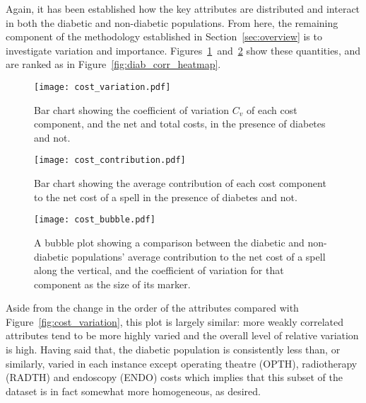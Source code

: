 Again, it has been established how the key attributes are distributed and
interact in both the diabetic and non-diabetic populations. From here, the 
remaining component of the methodology established in Section~\ref{sec:overview}
is to investigate variation and importance.
Figures~\ref{fig:diab_variation}~and~\ref{fig:diab_contribution} show these
quantities, and are ranked as in Figure~\ref{fig:diab_corr_heatmap}.

\begin{figure}[h]
    \centering
    \texttt{[image: cost\_variation.pdf]}
    \caption{Bar chart showing the coefficient of variation \(C_{v}\) of each
        cost component, and the net and total costs, in the presence of diabetes
        and not.}%
    \label{fig:diab_variation}
\end{figure}

\begin{figure}[h]
    \centering
    \texttt{[image: cost\_contribution.pdf]}
    \caption{Bar chart showing the average contribution of each cost component
        to the net cost of a spell in the presence of diabetes and not.}%
    \label{fig:diab_contribution}
\end{figure}

\begin{figure}[h]
    \centering
    \texttt{[image: cost\_bubble.pdf]}
    \caption{A bubble plot showing a comparison between the diabetic and
        non-diabetic populations' average contribution to the net cost of a
        spell along the vertical, and the coefficient of variation for that
        component as the size of its marker.}%
    \label{fig:diab_bubble}
\end{figure}

Aside from the change in the order of the attributes compared with
Figure~\ref{fig:cost_variation}, this plot is largely similar: more weakly
correlated attributes tend to be more highly varied and the overall level of
relative variation is high. Having said that, the diabetic population is
consistently less than, or similarly, varied in each instance except operating
theatre (OPTH), radiotherapy (RADTH) and endoscopy (ENDO) costs which implies
that this subset of the dataset is in fact somewhat more homogeneous, as
desired.

